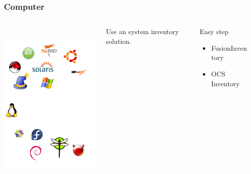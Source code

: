 \documentclass{beamer}
\begin{document}
\begin{frame}

    \frametitle{Computer}
 \begin{columns}
 \begin{column}{0.15\textwidth}
         \includegraphics[height=8.5cm]{./pics/os.pdf}
 \end{column}

 Use an system inventory solution.
 \begin{column}{1.25\textwidth}
    \begin{block}{Easy step}
        \begin{itemize}
            \item FusionInventory
            \item OCS Inventory
        \end{itemize}
    \end{block}


 \end{column}
\end{columns}




\end{frame}
\end{document}
